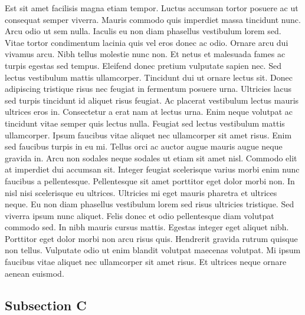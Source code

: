 \documentclass[11pt]{article}
\begin{document}
\par Est sit amet facilisis magna etiam tempor. Luctus accumsan tortor posuere ac ut consequat semper viverra. Mauris commodo quis imperdiet massa tincidunt nunc. Arcu odio ut sem nulla. Iaculis eu non diam phasellus vestibulum lorem sed. Vitae tortor condimentum lacinia quis vel eros donec ac odio. Ornare arcu dui vivamus arcu. Nibh tellus molestie nunc non. Et netus et malesuada fames ac turpis egestas sed tempus. Eleifend donec pretium vulputate sapien nec. Sed lectus vestibulum mattis ullamcorper. Tincidunt dui ut ornare lectus sit. Donec adipiscing tristique risus nec feugiat in fermentum posuere urna. Ultricies lacus sed turpis tincidunt id aliquet risus feugiat. Ac placerat vestibulum lectus mauris ultrices eros in. Consectetur a erat nam at lectus urna. Enim neque volutpat ac tincidunt vitae semper quis lectus nulla. Feugiat sed lectus vestibulum mattis ullamcorper. Ipsum faucibus vitae aliquet nec ullamcorper sit amet risus. Enim sed faucibus turpis in eu mi. Tellus orci ac auctor augue mauris augue neque gravida in. Arcu non sodales neque sodales ut etiam sit amet nisl. Commodo elit at imperdiet dui accumsan sit. Integer feugiat scelerisque varius morbi enim nunc faucibus a pellentesque. Pellentesque sit amet porttitor eget dolor morbi non. In nisl nisi scelerisque eu ultrices. Ultricies mi eget mauris pharetra et ultrices neque. Eu non diam phasellus vestibulum lorem sed risus ultricies tristique. Sed viverra ipsum nunc aliquet. Felis donec et odio pellentesque diam volutpat commodo sed. In nibh mauris cursus mattis. Egestas integer eget aliquet nibh. Porttitor eget dolor morbi non arcu risus quis. Hendrerit gravida rutrum quisque non tellus. Vulputate odio ut enim blandit volutpat maecenas volutpat. Mi ipsum faucibus vitae aliquet nec ullamcorper sit amet risus. Et ultrices neque ornare aenean euismod.

\subsection{Subsection C} \label{sec:subc}
\end{document}
